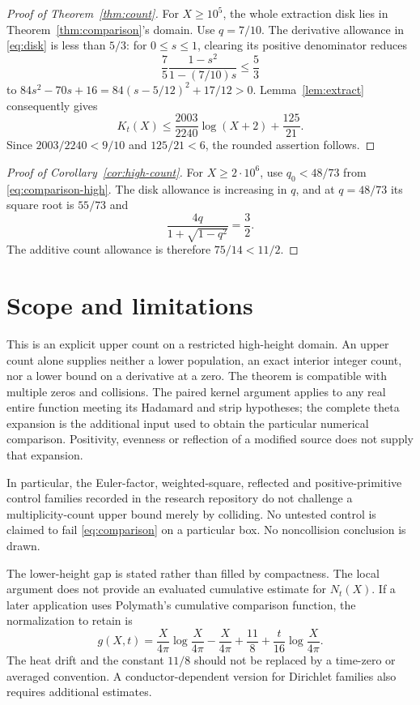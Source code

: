 \documentclass[11pt]{article}
\theoremstyle{remark}
\numberwithin{equation}{section}
\begin{document}
\begin{proof}[Proof of Theorem~\ref{thm:count}]
For $X\ge10^5$, the whole extraction disk lies in
Theorem~\ref{thm:comparison}'s domain. Use $q=7/10$.
The derivative allowance in \eqref{eq:disk} is less than $5/3$:
for $0\le s\le1$, clearing its positive denominator reduces
\[
 \frac75\frac{1-s^2}{1-(7/10)s}\le\frac53
\]
to $84s^2-70s+16=84(s-5/12)^2+17/12>0$.
Lemma~\ref{lem:extract} consequently gives
\[
 K_t(X)\le\frac{2003}{2240}\log(X+2)+\frac{125}{21}.
\]
Since $2003/2240<9/10$ and $125/21<6$, the rounded assertion follows.
\end{proof}

\begin{proof}[Proof of Corollary~\ref{cor:high-count}]
For $X\ge2\cdot10^6$, use $q_0<48/73$ from
\eqref{eq:comparison-high}. The disk allowance is increasing in $q$,
and at $q=48/73$ its square root is $55/73$ and
\[
 \frac{4q}{1+\sqrt{1-q^2}}=\frac32.
\]
The additive count allowance is therefore $75/14<11/2$.
\end{proof}

\section{Scope and limitations}\label{sec:scope}

This is an explicit upper count on a restricted high-height domain.
An upper count alone supplies neither a lower population, an exact
interior integer count, nor a lower bound on a derivative at a zero.
The theorem is compatible with multiple zeros and collisions. The
paired kernel argument applies to any real entire function meeting its
Hadamard and strip hypotheses; the complete theta expansion is the additional input used
to obtain the particular numerical comparison. Positivity, evenness or
reflection of a modified source does not supply that expansion.

In particular, the Euler-factor, weighted-square, reflected and
positive-primitive control families recorded in the research repository
do not challenge a multiplicity-count upper bound merely by colliding.
No untested control is claimed to fail \eqref{eq:comparison} on a
particular box. No noncollision conclusion is drawn.

The lower-height gap is stated rather than filled by compactness.
The local argument does not provide an evaluated cumulative estimate
for $N_t(X)$. If a later application uses Polymath's cumulative
comparison function, the normalization to retain is
\[
 g(X,t)=\frac{X}{4\pi}\log\frac{X}{4\pi}-\frac{X}{4\pi}
        +\frac{11}{8}+\frac{t}{16}\log\frac{X}{4\pi}.
\]
The heat drift and the constant $11/8$ should not be replaced by a
time-zero or averaged convention. A conductor-dependent version for
Dirichlet families also requires additional estimates.
\end{document}

